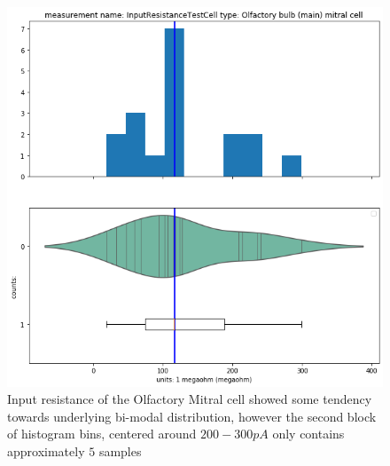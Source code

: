 \begin{figure}   
\begin{center}
   \includegraphics[scale=0.45]{notebooks_converted/needata_thesis_files/needata_thesis_5_21}
         \caption{Input resistance of the Olfactory Mitral cell showed some tendency towards underlying bi-modal distribution, however the second block of histogram bins, centered around $200-300pA$ only contains approximately $5$ samples}
\end{center}
\end{figure}
   
